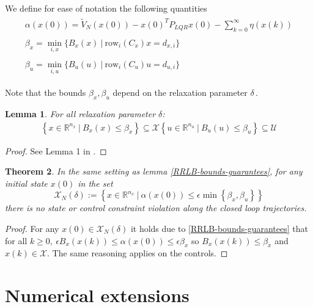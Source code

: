 \documentclass[12pt]{article}
\newtheorem{theorem}{Theorem}[section]
\newtheorem{lemma}[theorem]{Lemma}
\theoremstyle{definition}
\theoremstyle{remark}
\def\cal#1{\mathcal{#1}}
\newcommand{\R}{\mathbb{R}}
\begin{document}
We define for ease of notation the following quantities
\begin{align}
	\begin{split}\label{bruh}
		\alpha(x(0))=\tilde{V}_N(x(0))-x(0)^TP_{LQR}x(0)-\sum_{k=0}^\infty\eta(x(k))
	\end{split}\\
	\begin{split}\label{bruh2}
		\beta_x=\underset{i,x}{\min}\{B_x(x)~|~\mathrm{row}_i(C_x)x=d_{x,i}\}
	\end{split}\\
	\begin{split}\label{bruh3}
		\beta_u=\underset{i,u}{\min}\{B_u(u)~|~\mathrm{row}_i(C_u)u=d_{u,i}\}
	\end{split}
\end{align}

Note that the bounds $\beta_x,\beta_u$ depend on the relaxation parameter $\delta$\,.

\begin{lemma}
	\label{constraint-set-def-with-RRLB}
	For all relaxation parameter $\delta$:
	\begin{align*}
		\left\{x\in\R^{n_x}~|~B_x(x)\leq\beta_x\right\}\subseteq\cal{X}
		\left\{u\in\R^{n_u}~|~B_u(u)\leq\beta_u\right\}\subseteq\cal{U}
	\end{align*}
\end{lemma}

\begin{proof}
	See Lemma 1 in \cite{RRLB-linear-MPC}.
\end{proof}

\begin{theorem}
	In the same setting as lemma \ref{RRLB-bounds-guarantees}, for any initial state $x(0)$ in the set
	$$\cal{X}_N(\delta):=\left\{x\in\R^{n_x}~|~\alpha(x(0))\leq\epsilon\min\left\{\beta_x,\beta_u\right\}\right\}$$
	there is no state or control constraint violation along the closed loop trajectories.
\end{theorem}

\begin{proof}
	For any $x(0)\in\cal{X}_N(\delta)$ it holds due to \ref{RRLB-bounds-guarantees} that for all $k\geq 0,~\epsilon B_x(x(k))\leq\alpha(x(0))\leq\epsilon\beta_x$ so $B_x(x(k))\leq \beta_x$ and $x(k)\in\cal{X}$.
	The same reasoning applies on the controls.
\end{proof}

\section{Numerical extensions}
\end{document}
